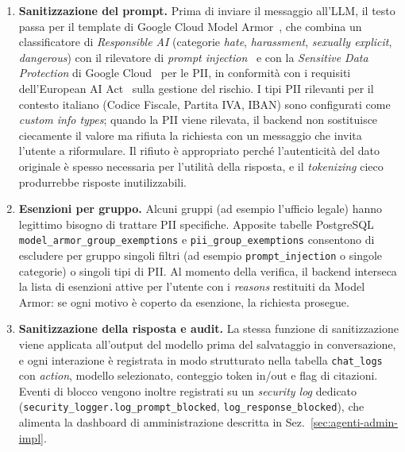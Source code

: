 \begin{enumerate}
  \item \textbf{Sanitizzazione del prompt.} Prima di inviare il messaggio
        all'LLM, il testo passa per il template di Google Cloud Model
        Armor~\cite{gcp_modelarmor}, che combina un classificatore di
        \emph{Responsible AI} (categorie \emph{hate}, \emph{harassment},
        \emph{sexually explicit}, \emph{dangerous}) con il rilevatore
        di \emph{prompt injection}~\cite{perez2022promptinjection} e con
        la \emph{Sensitive Data Protection} di Google Cloud~\cite{gcp_dlp}
        per le PII, in conformità con i requisiti dell'European AI
        Act~\cite{eu2024aiact} sulla gestione del rischio. I tipi PII rilevanti per il contesto italiano (Codice
        Fiscale, Partita IVA, IBAN) sono configurati come \emph{custom
        info types}; quando la PII viene rilevata, il backend non
        sostituisce ciecamente il valore ma rifiuta la richiesta con un
        messaggio che invita l'utente a riformulare. Il rifiuto è
        appropriato perché l'autenticità del dato originale è spesso
        necessaria per l'utilità della risposta, e il \emph{tokenizing}
        cieco produrrebbe risposte inutilizzabili.
  \item \textbf{Esenzioni per gruppo.} Alcuni gruppi (ad esempio l'ufficio
        legale) hanno legittimo bisogno di trattare PII specifiche.
        Apposite tabelle PostgreSQL \texttt{model\_armor\_group\_exemptions}
        e \texttt{pii\_group\_exemptions} consentono di escludere
        per gruppo singoli filtri (ad esempio \texttt{prompt\_injection}
        o singole categorie) o singoli tipi di PII. Al momento
        della verifica, il backend interseca la lista di esenzioni
        attive per l'utente con i \emph{reasons} restituiti da Model
        Armor: se ogni motivo è coperto da esenzione, la richiesta
        prosegue.
  \item \textbf{Sanitizzazione della risposta e audit.} La stessa funzione
        di sanitizzazione viene applicata all'output del modello prima del
        salvataggio in conversazione, e ogni interazione è registrata in
        modo strutturato nella tabella \texttt{chat\_logs} con
        \emph{action}, modello selezionato, conteggio token in/out e flag
        di citazioni. Eventi di blocco vengono inoltre registrati su un
        \emph{security log} dedicato (\texttt{security\_logger.log\_prompt\_blocked},
        \texttt{log\_response\_blocked}), che alimenta la dashboard di
        amministrazione descritta in Sez.~\ref{sec:agenti-admin-impl}.
\end{enumerate}

